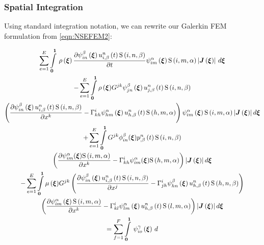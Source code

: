 \subsubsection{Spatial Integration}

Using standard integration notation, we can rewrite our Galerkin FEM formulation from \ref{eqn:NSEFEM2}:


\begin{multline}
 \label{NSEFEM3}
  \dsum_{e=1}^{E}\gint{\vectr{0}}{\vectr{1}}{\fnof{\rho}{\vectr{\xi}}\delby{\idxgbfn{i}{n}{\beta}{\vectr{\xi}}
      \fnof{\idxnodedof{u}{i}{n}{\beta}}{t}\idxgsf{i}{n}{\beta}}{t}
    \idxgbfn{i}{m}{\alpha}{\vectr{\xi}}\idxgsf{i}{m}{\alpha}
    \abs{\fnof{\matr{J}}{\vectr{\xi}}}}{\vectr{\xi}}\\
  - \dsum_{e=1}^{E}\dintl{\vectr{0}}{\vectr{1}}{\fnof{\rho}{\vectr{\xi}}}G^{jk}\idxgbfn{j}{n}{\beta}{\vectr{\xi}}
  \fnof{\idxnodedof{u}{j}{n}{\beta}}{t}\idxgsf{i}{n}{\beta}\\
  \pbrac{\delby{\idxgbfn{i}{n}{\beta}{\vectr{\xi}}\fnof{\idxnodedof{u}{i}{n}{\beta}}{t}
      \idxgsf{i}{n}{\beta}}{x^{k}}-\christoffel{i}{k}{h}\idxgbfn{h}{m}{\alpha}{\vectr{\xi}}
    \fnof{\idxnodedof{u}{h}{n}{\beta}}{t}\idxgsf{h}{m}{\alpha}}
  \idxgbfn{i}{m}{\alpha}{\vectr{\xi}}\idxgsf{i}{m}{\alpha}
  \abs{\fnof{\matr{J}}{\vectr{\xi}}}d\vectr{\xi}\\
  +\dsum_{e=1}^{E}\dintl{\vectr{0}}{\vectr{1}}G^{jk}\phi_{in}^{\beta}({\vectr{\xi}})
  \fnof{\idxnodedof{p}{}{n}{\beta}}{t}\idxgsf{i}{n}{\beta}\\
  \pbrac{\delby{\psi_{im}^{\alpha}({\vectr{\xi}})\idxgsf{i}{m}{\alpha}}{x^{k}}-
  \christoffel{i}{k}{h}\psi_{im}^{\alpha}({\vectr{\xi}})\idxgsf{h}{m}{\alpha}
    }\abs{\fnof{\matr{J}}{\vectr{\xi}}}d\vectr{\xi}\\
  -\dsum_{e=1}^{E}\dintl{\vectr{0}}{\vectr{1}}{\fnof{\mu}{\vectr{\xi}}}G^{jk}\pbrac{\delby{\idxgbfn{i}{n}{\beta}{\vectr{\xi}}
     \fnof{\idxnodedof{u}{i}{n}{\beta}}{t}\idxgsf{i}{n}{\beta}}{x^{j}}-
      \christoffel{i}{j}{h}\idxgbfn{h}{n}{\beta}{\vectr{\xi}}
      \fnof{\idxnodedof{u}{h}{n}{\beta}}{t}\idxgsf{h}{n}{\beta}} \\
    \pbrac{\delby{\idxgbfn{i}{m}{\alpha}{\vectr{\xi}}\idxgsf{i}{m}{\alpha}}{x^{k}}-
      \christoffel{i}{k}{l}\idxgbfn{l}{m}{\alpha}{\vectr{\xi}}
      \fnof{\idxnodedof{u}{h}{n}{\beta}}{t}
      \idxgsf{l}{m}{\alpha}}\abs{\fnof{\matr{J}}{\vectr{\xi}}}d\vectr{\xi}\\
  =\dsum_{f=1}^{F}\gint{\vectr{0}}{\vectr{1}}{\idxgbfn{i}{o}{\gamma}{\vectr{\xi}}
}
\end{multline}
